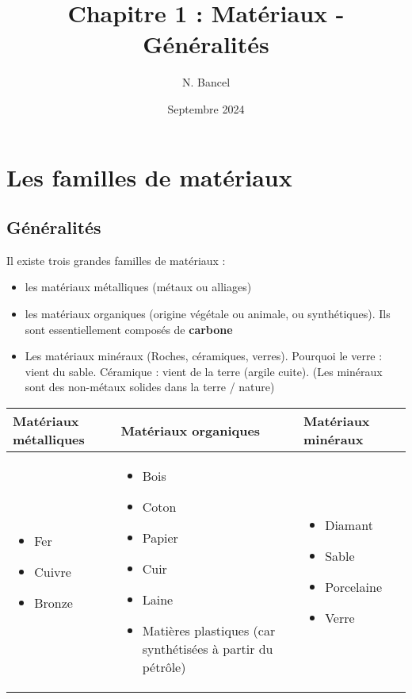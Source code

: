 \documentclass[a4paper,12pt]{article}
\begin{document}
\title{Chapitre 1 : Matériaux - Généralités}
\author{N. Bancel}
\date{Septembre 2024}
\maketitle

\section{Les familles de matériaux}

\subsection{Généralités}

Il existe trois grandes familles de matériaux :

\begin{itemize}[noitemsep]
  \item les matériaux métalliques (métaux ou alliages)
  \item les matériaux organiques (origine végétale ou animale, ou synthétiques). Ils sont essentiellement composés de \textbf{carbone}
  \item Les matériaux minéraux (Roches, céramiques, verres). Pourquoi le verre : vient du sable. Céramique : vient de la terre (argile cuite). (Les minéraux sont des non-métaux solides dans la terre / nature)
\end{itemize}

\begin{tabular}{p{5cm}p{5cm}p{5cm}}
  \toprule
  {Matériaux métalliques} & {Matériaux organiques} & {Matériaux minéraux} \\
  \midrule
  \begin{itemize}[noitemsep]
    \item Fer
    \item Cuivre
    \item Bronze
  \end{itemize} & 
  \begin{itemize}[noitemsep]
    \item Bois
    \item Coton
    \item Papier
    \item Cuir
    \item Laine
    \item Matières plastiques (car synthétisées à partir du pétrôle)
  \end{itemize}
   & 
   \begin{itemize}[noitemsep]
    \item Diamant
    \item Sable
    \item Porcelaine
    \item Verre 
  \end{itemize} \\
  \bottomrule
\end{tabular}
\end{document}
